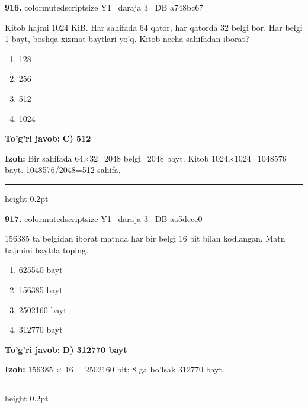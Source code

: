\documentclass[10pt,a4paper,oneside]{article}
\begin{document}
\noindent\textbf{\color{ink}916.}  {color{muted}scriptsize Y1 \textbullet\ daraja 3 \textbullet\ DB a748bc67}
\par
Kitob hajmi 1024 KiB. Har sahifada 64 qator, har qatorda 32 belgi bor. Har belgi 1 bayt, boshqa xizmat baytlari yo'q. Kitob necha sahifadan iborat?
\begin{enumerate}[label=\Alph*),leftmargin=9mm]
\item 128
\item 256
\item 512
\item 1024
\end{enumerate}
\begin{tcolorbox}[enhanced,breakable,colback=teal!4,colframe=teal!50!black,boxrule=0.5pt,arc=1.1mm,left=3mm,right=3mm,top=1.7mm,bottom=1.7mm,before skip=2mm,after skip=2mm]
\textbf{\color{teal}To'g'ri javob:} \textbf{C) 512}
\par\smallskip
\textbf{Izoh:} Bir sahifada 64\ensuremath{\times}32=2048 belgi=2048 bayt. Kitob 1024\ensuremath{\times}1024=1048576 bayt. 1048576/2048=512 sahifa.
\end{tcolorbox}
\vspace{2mm}\hrule height 0.2pt \vspace{3mm}

\noindent\textbf{\color{ink}917.}  {color{muted}scriptsize Y1 \textbullet\ daraja 3 \textbullet\ DB aa5dcce0}
\par
156385 ta belgidan iborat matnda har bir belgi 16 bit bilan kodlangan. Matn hajmini baytda toping.
\begin{enumerate}[label=\Alph*),leftmargin=9mm]
\item 625540 bayt
\item 156385 bayt
\item 2502160 bayt
\item 312770 bayt
\end{enumerate}
\begin{tcolorbox}[enhanced,breakable,colback=teal!4,colframe=teal!50!black,boxrule=0.5pt,arc=1.1mm,left=3mm,right=3mm,top=1.7mm,bottom=1.7mm,before skip=2mm,after skip=2mm]
\textbf{\color{teal}To'g'ri javob:} \textbf{D) 312770 bayt}
\par\smallskip
\textbf{Izoh:} 156385 \ensuremath{\times} 16 = 2502160 bit; 8 ga bo'lsak 312770 bayt.
\end{tcolorbox}
\vspace{2mm}\hrule height 0.2pt \vspace{3mm}
\end{document}
